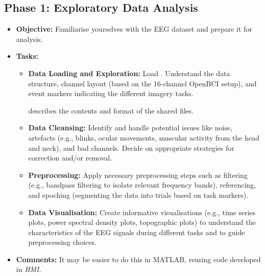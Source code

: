 \documentclass[11pt]{exam}
\begin{document}
    \subsection{Phase 1: Exploratory Data Analysis}
    \begin{itemize}
        \item \textbf{Objective:} Familiarise yourselves with the EEG dataset and prepare it for analysis.
        \item \textbf{Tasks:}
        \begin{itemize}
            \item \textbf{Data Loading and Exploration:} Load \href{https://drive.google.com/drive/folders/1b7Uo\_FO52\_-f4F-DbzYgpeiylx90f\_-n}{}. Understand the data structure, channel layout (based on the 16-channel OpenBCI setup), and event markers indicating the different imagery tasks.

             describes the contents and format of the shared files.

            \item \textbf{Data Cleansing:} Identify and handle potential issues like noise, artefacts (e.g., blinks, ocular movements, muscular activity from the head and neck), and bad channels. Decide on appropriate strategies for correction and/or removal.
            \item \textbf{Preprocessing:} Apply necessary preprocessing steps such as filtering (e.g., bandpass filtering to isolate relevant frequency bands), referencing, and epoching (segmenting the data into trials based on task markers).
            \item \textbf{Data Visualisation:} Create informative visualisations (e.g., time series plots, power spectral density plots, topographic plots) to understand the characteristics of the EEG signals during different tasks and to guide preprocessing choices.
        \end{itemize}
        \item \textbf{Comments:} It may be easier to do this in MATLAB, reusing code developed in \emph{HMI}.
    \end{itemize}
\end{document}
